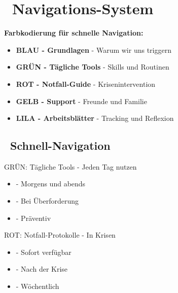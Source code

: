 \section*{\texorpdfstring{\textcolor{ctmmBlue}{\faMap~Navigations-System}}{Navigations-System}}
\label{sec:navigation}

\begin{ctmmBlueBox}[title=Orientierung im CTMM-System]
\textbf{Farbkodierung für schnelle Navigation:}

\begin{itemize}
    \item \textcolor{ctmmBlue}{\textbf{BLAU - Grundlagen}} - Warum wir uns triggern
    \item \textcolor{ctmmGreen}{\textbf{GRÜN - Tägliche Tools}} - Skills und Routinen  
    \item \textcolor{ctmmRed}{\textbf{ROT - Notfall-Guide}} - Krisenintervention
    \item \textcolor{ctmmYellow}{\textbf{GELB - Support}} - Freunde und Familie
    \item \textcolor{ctmmPurple}{\textbf{LILA - Arbeitsblätter}} - Tracking und Reflexion
\end{itemize}
\end{ctmmBlueBox}

\vspace{0.5cm}

\subsection*{\faChevronRight~Schnell-Navigation}

\begin{ctmmGreenBox}{GRÜN: Tägliche Tools - Jeden Tag nutzen}
\begin{itemize}
    \item {} - Morgens und abends
    \item {} - Bei Überforderung
    \item {} - Präventiv
\end{itemize}
\end{ctmmGreenBox}

\begin{ctmmRedBox}{ROT: Notfall-Protokolle - In Krisen}
\begin{itemize}
    \item {} - Sofort verfügbar
    \item {} - Nach der Krise
    \item {} - Wöchentlich
\end{itemize}
\end{ctmmRedBox}

